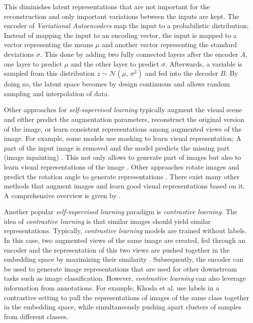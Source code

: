 This diminishes latent representations that are not important for the reconstruction and only important variations between the inputs are kept.
The encoder of \emph{Variational Autoencoders} map the input to a probabilistic distribution; Instead of mapping the input to an encoding vector, the input is mapped to a vector representing the means $\mu$ and another vector representing the standard deviations $\sigma$.
This done by adding two fully connected layers after the encoder $A$, one layer to predict $\mu$ and the other layer to predict $\sigma$.
Afterwards, a variable is sampled from this distribution $z \sim \mathcal{N}(\mu,\,\sigma^{2})$ and fed into the decoder $B$.
By doing so, the latent space becomes by design continuous and allows random sampling and interpolation of data.

Other approaches for \emph{self-supervised learning} typically augment the visual scene and either predict the augmentation parameters, reconstruct the original version of the image, or learn consistent representations among augmented views of the image.
For example, some models use masking to learn visual representation;
A part of the input image is removed and the model predicts the missing part (image inpainting) \cite{Elharrouss_Almaadeed_Al-Maadeed_Akbari_2020}.
This not only allows to generate part of images but also to learn visual representations of the image .
Other approaches rotate images and predict the rotation angle to generate representations .
There exist many other methods that augment images and learn good visual representations based on it.
A comprehensive overview is given by .

Another popular \emph{self-supervised learning} paradigm is \emph{contrastive learning}.
The idea of \emph{contrastive learning} is that similar images should yield similar representations.
Typically, \emph{contrastive learning} models are trained without labels.
In this case, two augmented views of the same image are created, fed through an encoder and the representation of this two views are pushed together in the embedding space by maximizing their similarity .
Subsequently, the encoder can be used to generate image representations that are used for other downstream tasks such as image classification.
However, \emph{contrastive learning} can also leverage information from annotations.
For example, Khosla et al.  use labels in a contrastive setting to pull the representations of images of the same class together in the embedding space, while simultaneously pushing apart clusters of samples from different classes.

